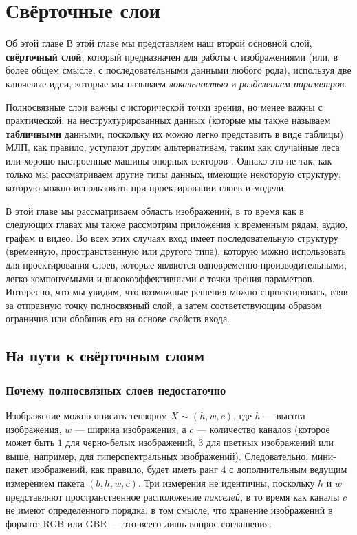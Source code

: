 \chapter{Свёрточные слои}
\label{chap:cnns}

\begin{supportbox}{Об этой главе}
В этой главе мы представляем наш второй основной слой, \textbf{свёрточный слой}, который предназначен для работы с изображениями (или, в более общем смысле, с последовательными данными любого рода), используя две ключевые идеи, которые мы называем \textit{локальностью} и \textit{разделением параметров}.
\end{supportbox}

Полносвязные слои важны с исторической точки зрения, но менее важны с практической: на неструктурированных данных (которые мы также называем \textbf{табличными} данными, поскольку их можно легко представить в виде таблицы) МЛП, как правило, уступают другим альтернативам, таким как случайные леса или хорошо настроенные машины опорных векторов \cite{grinsztajn2022tree}. Однако это не так, как только мы рассматриваем другие типы данных, имеющие некоторую структуру, которую можно использовать при проектировании слоев и модели.

В этой главе мы рассматриваем область изображений, в то время как в следующих главах мы также рассмотрим приложения к временным рядам, аудио, графам и видео. Во всех этих случаях вход имеет последовательную структуру (временную, пространственную или другого типа), которую можно использовать для проектирования слоев, которые являются одновременно производительными, легко компонуемыми и высокоэффективными с точки зрения параметров. Интересно, что мы увидим, что возможные решения можно спроектировать, взяв за отправную точку полносвязный слой, а затем соответствующим образом ограничив или обобщив его на основе свойств входа.
%
\section{На пути к свёрточным слоям}
\label{sec:towards_convolutive_layers}
%
\subsection{Почему полносвязных слоев недостаточно}
%
Изображение можно описать тензором $X \sim(h,w,c)$, где $h$ — высота изображения, $w$ — ширина изображения, а $c$ — количество каналов (которое может быть $1$ для черно-белых изображений, $3$ для цветных изображений или выше, например, для гиперспектральных изображений). Следовательно, мини-пакет изображений, как правило, будет иметь ранг $4$ с дополнительным ведущим измерением пакета $(b, h, w, c)$. Три измерения не идентичны, поскольку $h$ и $w$ представляют пространственное расположение \textit{пикселей}, в то время как каналы $c$ не имеют определенного порядка, в том смысле, что хранение изображений в формате RGB или GBR — это всего лишь вопрос соглашения. 

